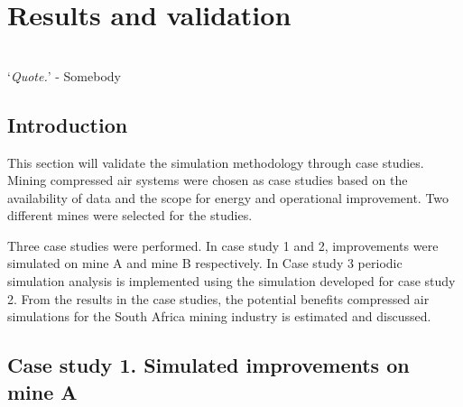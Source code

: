 \chapter{Results and validation}
\thispagestyle{empty}
\vspace{38em}
\hrulefill
\\
\enquote*{\textit{Quote.}} - Somebody\\
\newpage
\section{Introduction}
This section will validate the simulation methodology through case studies. Mining compressed air systems were chosen as case studies based on the availability of data and the scope for energy and operational improvement. Two different mines were selected for the studies. 
\par 
Three case studies were performed. In case study 1 and 2, improvements were simulated on mine A and mine B respectively. In Case study 3 periodic simulation analysis is implemented using the simulation developed for case study 2. From the results in the case studies, the potential benefits compressed air simulations for the South Africa mining industry is estimated and discussed.

\section{Case study 1. Simulated improvements on mine A}
